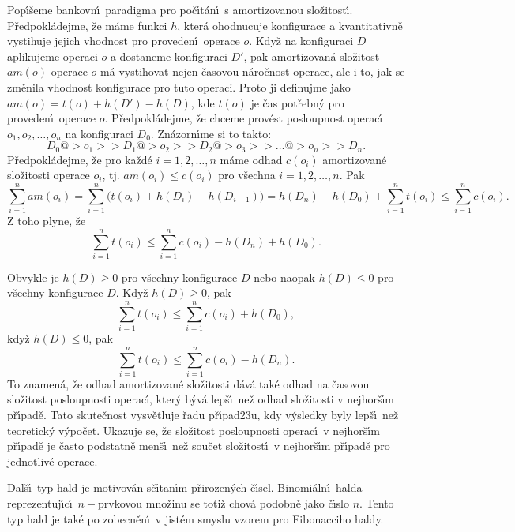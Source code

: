 \flushpar Pop\'\i\v seme bankovn\'\i\ paradigma pro po\v c\'\i t\'an\'\i\ s 
amortizovanou slo\v zitost\'\i . P\v redpokl\'adejme, \v ze m\'ame funkci $
h$, 
kter\'a ohodnucuje konfigurace a kvantitativn\v e vystihuje 
jejich vhodnost pro proveden\'\i\ operace $o$. 
Kdy\v z na konfiguraci $D$ aplikujeme operaci $o$ 
a dostaneme konfiguraci $D'$, pak amortizovan\'a slo\v zitost 
$am(o)$ ope\-race $o$ m\'a vystihovat nejen \v casovou n\'aro\v cnost 
operace, ale i to, jak se zm\v enila vhodnost konfigurace pro 
tuto operaci. Proto ji defi\-nujme jako $am(o)=t(o)+h(D')-h(D)$, kde $
t(o)$ je 
\v cas pot\v rebn\'y pro proveden\'\i\ operace $o$. P\v redpokl\'adejme, 
\v ze chceme prov\'est posloupnost operac\'\i\ $o_1,o_2,\dots,o_n$ na 
konfiguraci $D_0$. Zn\'azorn\'\i me si to takto:
$$D_0@>{o_1}>>D_1@>{o_2}>>D_2@>{o_3}>>\dots@>{o_n}>>D_n.$$
P\v redpokl\'adejme, \v ze pro ka\v zd\'e $i=1,2,\dots,n$ m\'ame odhad 
$c(o_i)$ amortizovan\'e slo\v zitos\-ti operace $o_i$, tj. $am(o_
i)\le c(o_i)$ 
pro v\v sechna $i=1,2,\dots,n$. Pak
$$\sum_{i=1}^nam(o_i)=\sum_{i=1}^n\big(t(o_i)+h(D_i)-h(D_{i-1})\big
)=h(D_n)-h(D_0)+\sum_{i=1}^nt(o_i)\le\sum_{i=1}^nc(o_i).$$
Z toho plyne, \v ze 
$$\sum_{i=1}^nt(o_i)\le\sum_{i=1}^nc(o_i)-h(D_n)+h(D_0).$$
\medskip

\flushpar Obvykle je $h(D)\ge 0$ pro v\v sechny konfigurace $D$ 
nebo naopak $h(D)\le 0$ 
pro v\v sechny konfigurace $D$. Kdy\v z $h(D)\ge 0$, pak 
$$\sum_{i=1}^nt(o_i)\le\sum_{i=1}^nc(o_i)+h(D_0),$$
kdy\v z $h(D)\le 0$, pak 
$$\sum_{i=1}^nt(o_i)\le\sum_{i=1}^nc(o_i)-h(D_n).$$
To znamen\'a, \v ze odhad amortizovan\'e slo\v zitosti d\'av\'a tak\'e odhad 
na \v casovou slo\v zitost posloupnosti operac\'\i , kter\'y b\'yv\'a lep\v s\'\i\ ne\v z odhad slo\v zitosti v 
nejhor\v s\'\i m p\v r\'\i pad\v e.  Tato skute\v cnost vysv\v etluje \v radu 
p\v r\'\i pad\accent23u, kdy 
v\'ysledky byly lep\v s\'\i\ ne\v z teoretick\'y v\'ypo\v cet.  Ukazuje se, \v ze 
slo\v zitost posloupnosti operac\'\i\ v nejhor\v s\'\i m p\v r\'\i pad\v e je \v casto podstatn\v e 
men\v s\'\i\ ne\v z sou\v cet slo\v zitost\'\i\ v nejhor\v s\'\i m p\v r\'\i pad\v e pro 
jednotliv\'e operace.  
\bigskip

\centerline{}
\medskip

\flushpar Dal\v s\'\i\ typ hald je motivov\'an s\v c\'\i tan\'\i m p\v rirozen\'ych \v c\'\i sel.  
Binomi\'aln\'\i\ halda reprezentuj\'\i c\'\i\ $n-$prvkovou mno\v zinu se 
toti\v z chov\'a 
podobn\v e jako \v c\'\i slo $n$.  Tento typ hald je tak\'e po zobecn\v en\'\i\ v jist\'em 
smyslu vzorem pro Fibonacciho haldy.  
\medskip

